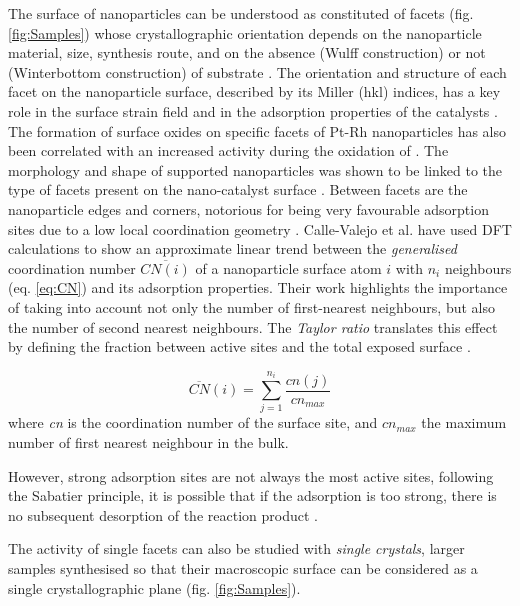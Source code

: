 The surface of nanoparticles can be understood as constituted of facets (fig. \ref{fig:Samples}) whose crystallographic orientation depends on the nanoparticle material, size, synthesis route, and on the absence (Wulff construction) or not (Winterbottom construction) of substrate \parencite{Wulff1901, Winterbottom1967, Boukouvala2021}.
The orientation and structure of each facet on the nanoparticle surface, described by its Miller (hkl) indices, has a key role in the surface strain field and in the adsorption properties of the catalysts \parencite{Zhou2012, Wu2017, Altantzis2019, Wu2021}.
The formation of surface oxides on specific facets of Pt-Rh nanoparticles has also been correlated with an increased activity during the oxidation of  \parencite{Hejral2018}.
The morphology and shape of supported nanoparticles was shown to be linked to the type of facets present on the nano-catalyst surface \parencite{Ndolomingo2020}.
Between facets are the nanoparticle edges and corners, notorious for being very favourable adsorption sites due to a low local coordination geometry \parencite{Huang2008, Jiang2009}.
Calle-Valejo et al. \parencite*{CalleVallejo2014, CalleVallejo2015, CalleVallejo2018, CalleVallejo2023} have used DFT calculations to show an approximate linear trend between the \textit{generalised} coordination number $\overline{CN(i)}$ of a nanoparticle surface atom $i$ with $n_i$ neighbours (eq. \ref{eq:CN}) and its adsorption properties.
Their work highlights the importance of taking into account not only the number of first-nearest neighbours, but also the number of second nearest neighbours.
The \textit{Taylor ratio} translates this effect by defining the fraction between active sites and the total exposed surface \parencite{Taylor1925}.

\begin{equation}
    \overline{CN}(i) = \sum_{j=1}^{n_i} \frac{cn(j)}{cn_{max}}
    \label{eq:CN}
\end{equation}
where \textit{cn} is the coordination number of the surface site, and $cn_{max}$ the maximum number of first nearest neighbour in the bulk.

However, strong adsorption sites are not always the most active sites, following the Sabatier principle, it is possible that if the adsorption is too strong, there is no subsequent desorption of the reaction product \parencite{Nilsson2005, Jiang2009}.

The activity of single facets can also be studied with \textit{single crystals}, larger samples synthesised so that their macroscopic surface can be considered as a single crystallographic plane (fig. \ref{fig:Samples}).

